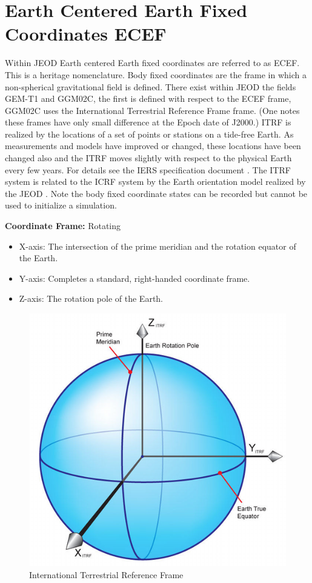 
\section{Earth Centered Earth Fixed Coordinates ECEF } \label{sec:itrf} 
Within JEOD Earth centered Earth fixed coordinates are referred to as ECEF.
This is a heritage nomenclature. Body fixed coordinates are the frame in which a non-spherical gravitational field is defined. There exist within JEOD the fields GEM-T1 and GGM02C, the first is defined with respect to the ECEF frame, GGM02C uses the International Terrestrial Reference Frame frame. (One notes these frames have only small difference at the Epoch date of J2000.)
ITRF is realized by the locations of a set of points or stations on a tide-free Earth. As measurements and models have improved or changed, these locations have been changed also and the ITRF moves slightly with respect to the physical Earth every few years.
For details see the IERS specification document \cite{IERS2003}. The ITRF system is related to the ICRF system by the Earth orientation model realized by the JEOD \RNP.
Note the body fixed coordinate states can be recorded but cannot be used to initialize a simulation.

\textbf{Coordinate Frame: } Rotating

\begin{itemize}
\item X-axis: The intersection of the prime meridian and the rotation equator of the Earth.
\item Y-axis: Completes a standard, right-handed coordinate frame.
\item Z-axis: The rotation pole of the Earth.
\end{itemize}

\begin{figure}[htp]
\centering
\includegraphics [width=7in]{figs/fig5.png}
\caption{International Terrestrial Reference Frame}
\label{fig:5}
\end{figure}


